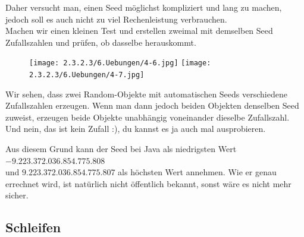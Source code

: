\documentclass{scrartcl}   %
\begin{document}
\begin{itemize}
    Daher versucht man, einen Seed möglichst kompliziert und lang zu machen, jedoch soll es auch nicht zu viel Rechenleistung verbrauchen.\\
    
    Machen wir einen kleinen Test und erstellen zweimal mit demselben Seed Zufallszahlen und prüfen, ob dasselbe herauskommt.
    
    \begin{figure}[ht]
	    \centering
	    \texttt{[image: 2.3.2.3/6.Uebungen/4-6.jpg]}
	    \hspace{1cm}
	    \texttt{[image: 2.3.2.3/6.Uebungen/4-7.jpg]}
    \end{figure}
    
    Wir sehen, dass zwei Random-Objekte mit automatischen Seeds verschiedene \glqq Zufallszahlen\grqq{} erzeugen. Wenn man dann jedoch beiden Objekten denselben Seed zuweist, erzeugen beide Objekte unabhängig voneinander dieselbe \glqq Zufallszahl\grqq{}. Und nein, das ist kein Zufall :), du kannst es ja auch mal ausprobieren.
    
    Aus diesem Grund kann der Seed bei Java als niedrigsten Wert $-9.223.372.036.854.775.808$\\
    und $9.223.372.036.854.775.807$ als höchsten Wert annehmen. Wie er genau errechnet wird, ist natürlich nicht öffentlich bekannt, sonst wäre es nicht mehr sicher.
\end{itemize}

\newpage

\subsection{Schleifen}
\end{document}
